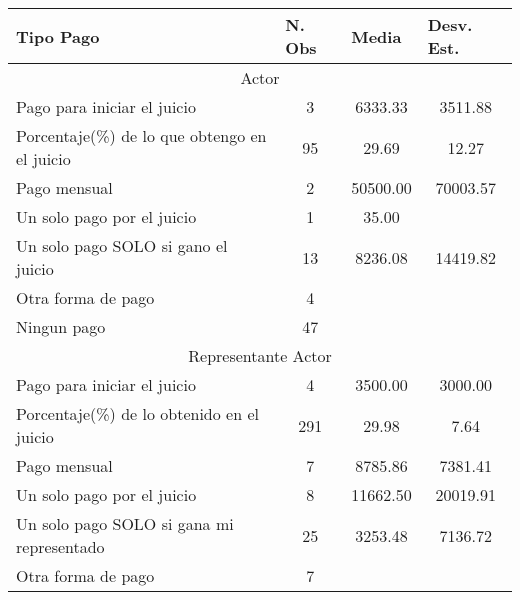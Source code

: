 \begin{tabular}{rrrr}
\toprule
\multicolumn{1}{l}{Tipo Pago} & \multicolumn{1}{l}{N. Obs} & \multicolumn{1}{l}{Media} & \multicolumn{1}{l}{Desv. Est.} \\
\midrule
\multicolumn{4}{c}{Actor} \\
\midrule
\multicolumn{1}{l}{Pago para iniciar el juicio} & \multicolumn{1}{c}{3} & \multicolumn{1}{c}{6333.33} & \multicolumn{1}{c}{3511.88} \\
\multicolumn{1}{l}{Porcentaje(\%) de lo que obtengo en el juicio} & \multicolumn{1}{c}{95} & \multicolumn{1}{c}{29.69} & \multicolumn{1}{c}{12.27} \\
\multicolumn{1}{l}{Pago mensual} & \multicolumn{1}{c}{2} & \multicolumn{1}{c}{50500.00} & \multicolumn{1}{c}{70003.57} \\
\multicolumn{1}{l}{Un solo pago por el juicio} & \multicolumn{1}{c}{1} & \multicolumn{1}{c}{35.00} & \multicolumn{1}{c}{} \\
\multicolumn{1}{l}{Un solo pago SOLO si gano el juicio} & \multicolumn{1}{c}{13} & \multicolumn{1}{c}{8236.08} & \multicolumn{1}{c}{14419.82} \\
\multicolumn{1}{l}{Otra forma de pago} & \multicolumn{1}{c}{4} & \multicolumn{1}{c}{} & \multicolumn{1}{c}{} \\
\multicolumn{1}{l}{Ningun pago} & \multicolumn{1}{c}{47} & \multicolumn{1}{c}{} & \multicolumn{1}{c}{} \\
\midrule
\multicolumn{4}{c}{Representante Actor} \\
\midrule
\multicolumn{1}{l}{Pago para iniciar el juicio} & \multicolumn{1}{c}{4} & \multicolumn{1}{c}{3500.00} & \multicolumn{1}{c}{3000.00} \\
\multicolumn{1}{l}{Porcentaje(\%) de lo obtenido en el juicio} & \multicolumn{1}{c}{291} & \multicolumn{1}{c}{29.98} & \multicolumn{1}{c}{7.64} \\
\multicolumn{1}{l}{Pago mensual} & \multicolumn{1}{c}{7} & \multicolumn{1}{c}{8785.86} & \multicolumn{1}{c}{7381.41} \\
\multicolumn{1}{l}{Un solo pago por el juicio} & \multicolumn{1}{c}{8} & \multicolumn{1}{c}{11662.50} & \multicolumn{1}{c}{20019.91} \\
\multicolumn{1}{l}{Un solo pago SOLO si gana mi representado} & \multicolumn{1}{c}{25} & \multicolumn{1}{c}{3253.48} & \multicolumn{1}{c}{7136.72} \\
\multicolumn{1}{l}{Otra forma de pago} & \multicolumn{1}{c}{7} & \multicolumn{1}{c}{} & \multicolumn{1}{c}{} \\

\end{tabular}
